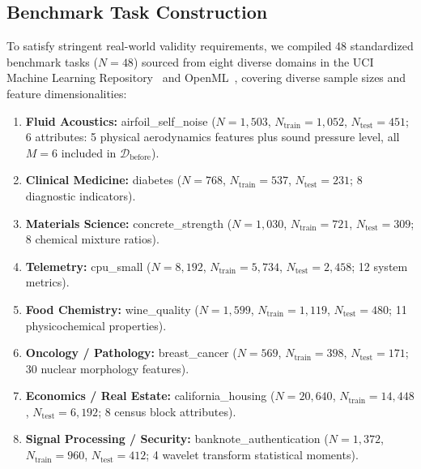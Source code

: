 \documentclass[sigconf]{acmart}
\begin{document}
\subsection{Benchmark Task Construction}
To satisfy stringent real-world validity requirements, we compiled 48 standardized benchmark tasks ($N=48$) sourced from eight diverse domains in the UCI Machine Learning Repository~\cite{dua2019uci} and OpenML~\cite{vanschoren2014openml}, covering diverse sample sizes and feature dimensionalities:
\begin{enumerate}
    \item \textbf{Fluid Acoustics:} \textsf{airfoil\_self\_noise} ($N=1,503$, $N_{\text{train}}=1,052$, $N_{\text{test}}=451$; 6 attributes: 5 physical aerodynamics features plus sound pressure level, all $M=6$ included in $\mathcal{D}_{\text{before}}$).
    \item \textbf{Clinical Medicine:} \textsf{diabetes} ($N=768$, $N_{\text{train}}=537$, $N_{\text{test}}=231$; 8 diagnostic indicators).
    \item \textbf{Materials Science:} \textsf{concrete\_strength} ($N=1,030$, $N_{\text{train}}=721$, $N_{\text{test}}=309$; 8 chemical mixture ratios).
    \item \textbf{Telemetry:} \textsf{cpu\_small} ($N=8,192$, $N_{\text{train}}=5,734$, $N_{\text{test}}=2,458$; 12 system metrics).
    \item \textbf{Food Chemistry:} \textsf{wine\_quality} ($N=1,599$, $N_{\text{train}}=1,119$, $N_{\text{test}}=480$; 11 physicochemical properties).
    \item \textbf{Oncology / Pathology:} \textsf{breast\_cancer} ($N=569$, $N_{\text{train}}=398$, $N_{\text{test}}=171$; 30 nuclear morphology features).
    \item \textbf{Economics / Real Estate:} \textsf{california\_housing} ($N=20,640$, $N_{\text{train}}=14,448$, $N_{\text{test}}=6,192$; 8 census block attributes).
    \item \textbf{Signal Processing / Security:} \textsf{banknote\_authentication} ($N=1,372$, $N_{\text{train}}=960$, $N_{\text{test}}=412$; 4 wavelet transform statistical moments).
\end{enumerate}
\end{document}
